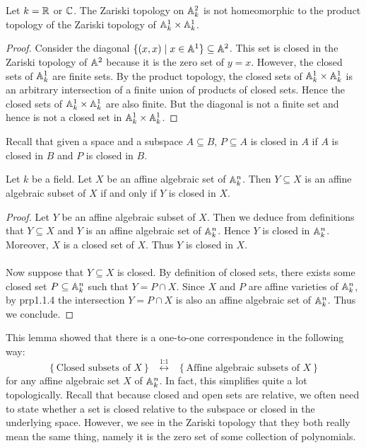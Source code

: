 \documentclass[a4paper]{article}
\begin{document}
\begin{eg}{}{} Let $k=\mathbb{R}$ or $\mathbb{C}$. The Zariski topology on $\mathbb{A}_k^2$ is not homeomorphic to the product topology of the Zariski topology of $\mathbb{A}_k^1\times\mathbb{A}_k^1$. \tcbline
\begin{proof}
Consider the diagonal $\{(x,x)\;|\;x\in\mathbb{A}^1\}\subseteq\mathbb{A}^2$. This set is closed in the Zariski topology of $\mathbb{A}^2$ because it is the zero set of $y=x$. However, the closed sets of $\mathbb{A}_k^1$ are finite sets. By the product topology, the closed sets of $\mathbb{A}_k^1\times\mathbb{A}_k^1$ is an arbitrary intersection of a finite union of products of closed sets. Hence the closed sets of $\mathbb{A}_k^1\times\mathbb{A}_k^1$ are also finite. But the diagonal is not a finite set and hence is not a closed set in $\mathbb{A}_k^1\times\mathbb{A}_k^1$. 
\end{proof}
\end{eg}

Recall that given a space and a subspace $A\subseteq B$, $P\subseteq A$ is closed in $A$ if $A$ is closed in $B$ and $P$ is closed in $B$. 

\begin{lmm}{}{} Let $k$ be a field. Let $X$ be an affine algebraic set of $\mathbb{A}_k^n$. Then $Y\subseteq X$ is an affine algebraic subset of $X$ if and only if $Y$ is closed in $X$. \tcbline
\begin{proof}
Let $Y$ be an affine algebraic subset of $X$. Then we deduce from definitions that $Y\subseteq X$ and $Y$ is an affine algebraic set of $\mathbb{A}_k^n$. Hence $Y$ is closed in $\mathbb{A}_k^n$. Moreover, $X$ is a closed set of $X$. Thus $Y$ is closed in $X$. \\~\\

Now suppose that $Y\subseteq X$ is closed. By definition of closed sets, there exists some closed set $P\subseteq\mathbb{A}_k^n$ such that $Y=P\cap X$. Since $X$ and $P$ are affine varieties of $\mathbb{A}_k^n$, by prp1.1.4 the intersection $Y=P\cap X$ is also an affine algebraic set of $\mathbb{A}_k^n$. Thus we conclude. 
\end{proof}
\end{lmm}

This lemma showed that there is a one-to-one correspondence in the following way: $$\left\{\text{Closed subsets of }X\right\}\;\;\overset{\text{1:1}}{\longleftrightarrow}\;\;\left\{\text{Affine algebraic subsets of }X\right\}$$ for any affine algebraic set $X$ of $\mathbb{A}_k^n$. In fact, this simplifies quite a lot topologically. Recall that because closed and open sets are relative, we often need to state whether a set is closed relative to the subspace or closed in the underlying space. However, we see in the Zariski topology that they both really mean the same thing, namely it is the zero set of some collection of polynomials. 
\end{document}
